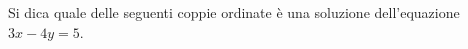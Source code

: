 Si dica quale delle seguenti coppie ordinate è una soluzione dell'equazione 
\(\displaystyle 3x - 4y = 5\). 